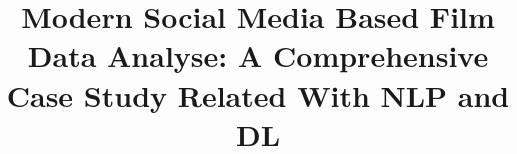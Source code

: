 \documentclass[sigconf]{acmart}
\begin{document}
\title{Modern Social Media Based Film Data Analyse: A Comprehensive Case Study Related With NLP and DL}

\maketitle














\end{document}
